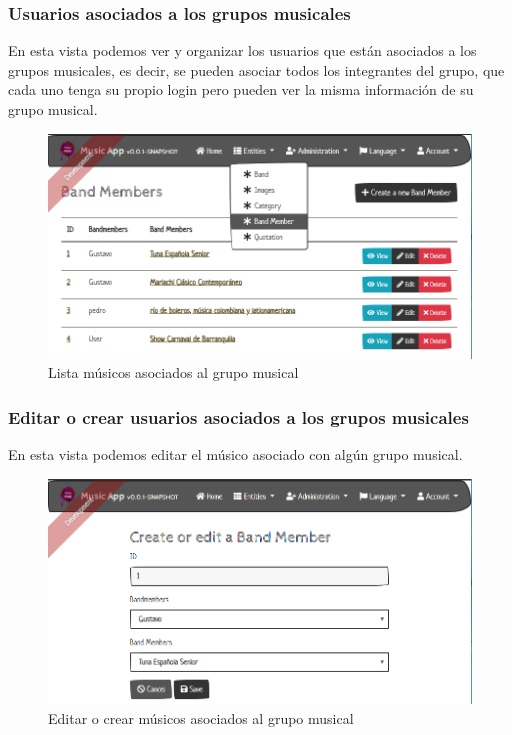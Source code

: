 \subsubsection{Usuarios asociados a los grupos musicales}
En esta vista podemos ver y organizar los usuarios que están asociados a los grupos musicales, es decir, se pueden asociar todos los integrantes del grupo, que cada uno tenga su propio login pero pueden ver la misma información de su grupo musical.
\begin{figure}[h!]
 \centering
\includegraphics[width=\linewidth]{Desarrollo/Interfaces/Interfaces/imgs/BandMemberList.PNG}
\caption{Lista músicos asociados al grupo musical}
\end{figure}

\newpage

\subsubsection{Editar o crear usuarios asociados a los grupos musicales}
En esta vista podemos editar el músico asociado con algún grupo musical.
\begin{figure}[h!]
 \centering
\includegraphics[width=0.8\linewidth]{Desarrollo/Interfaces/Interfaces/imgs/BandMemberEdit.PNG}
\caption{Editar o crear músicos asociados al grupo musical}
\end{figure}

